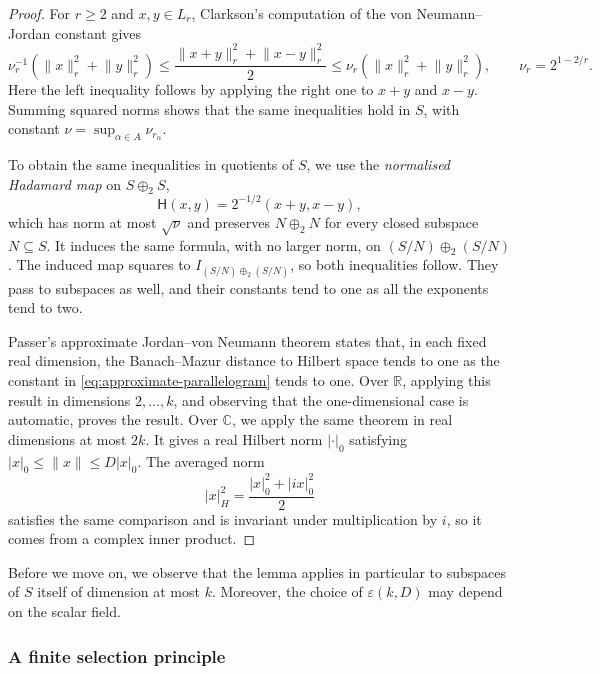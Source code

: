 \documentclass[11pt,a4paper,reqno]{amsart}
\theoremstyle{definition}
\newcommand{\R}{\mathbb R}
\newcommand{\C}{\mathbb C}
\newcommand{\norm}[1]{\lVert #1\rVert}
\numberwithin{equation}{section}
\begin{document}
\begin{proof}
For $r\geq2$ and $x,y\in L_r$, Clarkson's computation of the von Neumann--Jordan constant \cite{Clarkson1937} gives
\begin{equation}\label{eq:approximate-parallelogram}
    \nu_r^{-1}(\norm{x}_r^2+\norm{y}_r^2)
    \leq\frac{\norm{x+y}_r^2+\norm{x-y}_r^2}{2}
    \leq \nu_r(\norm{x}_r^2+\norm{y}_r^2),
    \qquad \nu_r=2^{1-2/r}.
\end{equation}
Here the left inequality follows by applying the right one to $x+y$ and $x-y$. Summing squared norms shows that the same inequalities hold in $S$, with constant $\nu=\sup_{\alpha\in A}\nu_{r_\alpha}$.

To obtain the same inequalities in quotients of $S$, we use the \emph{normalised Hadamard map} on $S\oplus_2 S$,
\begin{equation*}
 \mathsf H(x,y)=2^{-1/2}(x+y,x-y),
\end{equation*}
which has norm at most $\sqrt\nu$ and preserves $N\oplus_2N$ for every closed subspace $N\subseteq S$. It induces the same formula, with no larger norm, on $(S/N)\oplus_2(S/N)$. The induced map squares to $I_{(S/N)\oplus_2(S/N)}$, so both inequalities follow. They pass to subspaces as well, and their constants tend to one as all the exponents tend to two.

Passer's approximate Jordan--von Neumann theorem \cite[Theorem~3.4]{Passer2015} states that, in each fixed real dimension, the Banach--Mazur distance to Hilbert space tends to one as the constant in \eqref{eq:approximate-parallelogram} tends to one. Over $\R$, applying this result in dimensions $2,\ldots,k$, and observing that the one-dimensional case is automatic, proves the result. Over $\C$, we apply the same theorem in real dimensions at most $2k$. It gives a real Hilbert norm $|\cdot|_0$ satisfying $|x|_0\leq\norm x\leq D|x|_0$. The averaged norm
\begin{equation*}
 |x|_H^2=\frac{|x|_0^2+|ix|_0^2}{2}
\end{equation*}
satisfies the same comparison and is invariant under multiplication by $i$, so it comes from a complex inner product.
\end{proof}

Before we move on, we observe that the lemma applies in particular to subspaces of $S$ itself of dimension at most $k$. Moreover, the choice of $\varepsilon(k,D)$ may depend on the scalar field.

\subsubsection{A finite selection principle}
\end{document}
